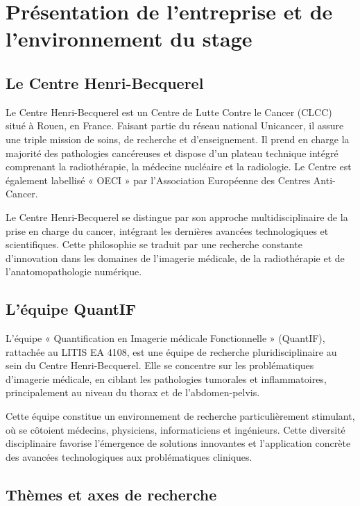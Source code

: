 \documentclass[12pt,a4paper]{report}
\begin{document}
\chapter{Présentation de l'entreprise et de l'environnement du stage}

\section{Le Centre Henri-Becquerel}

Le Centre Henri-Becquerel est un Centre de Lutte Contre le Cancer (CLCC) situé à Rouen, en France. Faisant partie du réseau national Unicancer, il assure une triple mission de soins, de recherche et d'enseignement. Il prend en charge la majorité des pathologies cancéreuses et dispose d'un plateau technique intégré comprenant la radiothérapie, la médecine nucléaire et la radiologie. Le Centre est également labellisé « OECI » par l'Association Européenne des Centres Anti-Cancer.

Le Centre Henri-Becquerel se distingue par son approche multidisciplinaire de la prise en charge du cancer, intégrant les dernières avancées technologiques et scientifiques. Cette philosophie se traduit par une recherche constante d'innovation dans les domaines de l'imagerie médicale, de la radiothérapie et de l'anatomopathologie numérique.

\section{L'équipe QuantIF}

L'équipe « Quantification en Imagerie médicale Fonctionnelle » (QuantIF), rattachée au LITIS EA 4108, est une équipe de recherche pluridisciplinaire au sein du Centre Henri-Becquerel. Elle se concentre sur les problématiques d'imagerie médicale, en ciblant les pathologies tumorales et inflammatoires, principalement au niveau du thorax et de l'abdomen-pelvis.

Cette équipe constitue un environnement de recherche particulièrement stimulant, où se côtoient médecins, physiciens, informaticiens et ingénieurs. Cette diversité disciplinaire favorise l'émergence de solutions innovantes et l'application concrète des avancées technologiques aux problématiques cliniques.

\section{Thèmes et axes de recherche}
\end{document}
